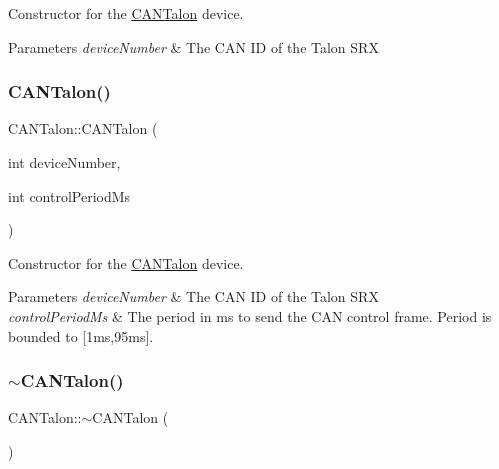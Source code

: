 Constructor for the \hyperlink{class_c_a_n_talon}{C\+A\+N\+Talon} device.


\begin{DoxyParams}{Parameters}
{\em device\+Number} & The C\+AN ID of the Talon S\+RX \\
\hline
\end{DoxyParams}
\mbox{\label{class_c_a_n_talon_afe5efd7f2c7b1fb3c6b818eb3d4617d7}} 
\subsubsection{\texorpdfstring{C\+A\+N\+Talon()}{CANTalon()}\hspace{0.1cm}{\footnotesize\ttfamily [2/2]}}
{\footnotesize\ttfamily C\+A\+N\+Talon\+::\+C\+A\+N\+Talon (\begin{DoxyParamCaption}\item[{int}]{device\+Number,  }\item[{int}]{control\+Period\+Ms }\end{DoxyParamCaption})\hspace{0.3cm}{\ttfamily [explicit]}}

Constructor for the \hyperlink{class_c_a_n_talon}{C\+A\+N\+Talon} device.


\begin{DoxyParams}{Parameters}
{\em device\+Number} & The C\+AN ID of the Talon S\+RX \\
\hline
{\em control\+Period\+Ms} & The period in ms to send the C\+AN control frame. Period is bounded to \mbox{[}1ms,95ms\mbox{]}. \\
\hline
\end{DoxyParams}
\mbox{\label{class_c_a_n_talon_a1f2577ad1683495db9ada33f71968df0}} 
\subsubsection{\texorpdfstring{$\sim$\+C\+A\+N\+Talon()}{~CANTalon()}}
{\footnotesize\ttfamily C\+A\+N\+Talon\+::$\sim$\+C\+A\+N\+Talon (\begin{DoxyParamCaption}{ }\end{DoxyParamCaption})\hspace{0.3cm}{\ttfamily [virtual]}}



